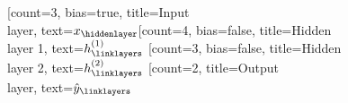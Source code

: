 \begin{neuralnetwork}[height=4]
  \newcommand{\x}[2]{$x_#2$}
  \newcommand{\y}[2]{$\hat{y}_#2$}
  \newcommand{\hfirst}[2]{\small $h^{(1)}_#2$}
  \newcommand{\hsecond}[2]{\small $h^{(2)}_#2$}
  [count=3, bias=true, title=Input\\layer, text=\x]
  \hiddenlayer[count=4, bias=false, title=Hidden\\layer 1, text=\hfirst] \linklayers
  \hiddenlayer[count=3, bias=false, title=Hidden\\layer 2, text=\hsecond] \linklayers
  \outputlayer[count=2, title=Output\\layer, text=\y] \linklayers
\end{neuralnetwork}

